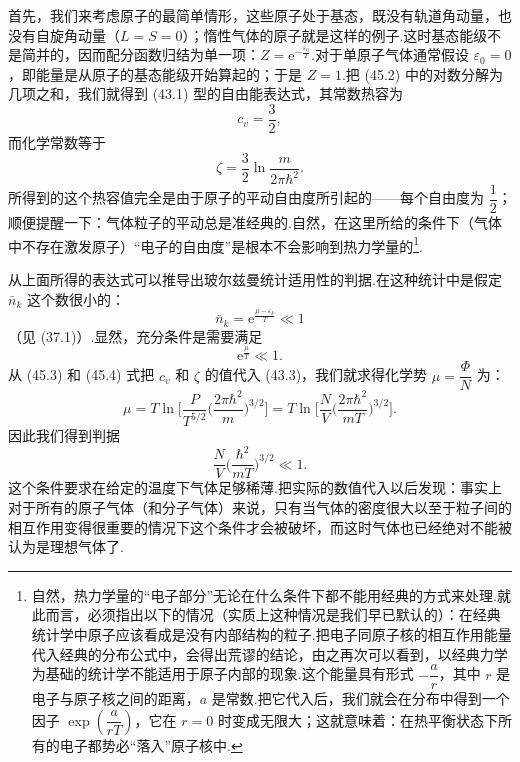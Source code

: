 首先，我们来考虑原子的最简单情形，这些原子处于基态，既没有轨道角动量，也没有自旋角动量（$L=S=0$）；惰性气体的原子就是这样的例子.这时基态能级不是简并的，因而配分函数归结为单一项：$Z=\mathrm{e}^{-\frac{\varepsilon_0}{T}}$.对于单原子气体通常假设 $\varepsilon_0=0$，即能量是从原子的基态能级开始算起的；于是 $Z=1$.把 (45.2) 中的对数分解为几项之和，我们就得到 (43.1) 型的自由能表达式，其常数热容为
\begin{equation}
  c_v=\frac{3}{2},
\end{equation}
而化学常数等于
\begin{equation}
  \zeta=\frac{3}{2}\ln\frac{m}{2\pi\hbar^2}.
\end{equation}
所得到的这个热容值完全是由于原子的平动自由度所引起的——每个自由度为 $\dfrac{1}{2}$；顺便提醒一下：气体粒子的平动总是准经典的.自然，在这里所给的条件下（气体中不存在激发原子）“电子的自由度”是根本不会影响到热力学量的\footnote{自然，热力学量的“电子部分”无论在什么条件下都不能用经典的方式来处理.就此而言，必须指出以下的情况（实质上这种情况是我们早已默认的）：在经典统计学中原子应该看成是没有内部结构的粒子.把电子同原子核的相互作用能量代入经典的分布公式中，会得出荒谬的结论，由之再次可以看到，以经典力学为基础的统计学不能适用于原子内部的现象.这个能量具有形式 $-\dfrac{a}{r}$，其中 $r$ 是电子与原子核之间的距离，$a$ 是常数.把它代入后，我们就会在分布中得到一个因子 $\exp\left(\dfrac{a}{rT}\right)$，它在 $r=0$ 时变成无限大；这就意味着：在热平衡状态下所有的电子都势必“落入”原子核中.}.

从上面所得的表达式可以推导出玻尔兹曼统计适用性的判据.在这种统计中是假定 $\bar{n}_k$ 这个数很小的：
\begin{equation*}
  \bar{n}_k=\mathrm{e}^{\frac{\mu-\varepsilon_k}{T}}\ll1
\end{equation*}
（见 (37.1)）.显然，充分条件是需要满足
\begin{equation*}
  \mathrm{e}^{\frac{\mu}{T}}\ll1.
\end{equation*}
从 (45.3) 和 (45.4) 式把 $c_v$ 和 $\zeta$ 的值代入 (43.3)，我们就求得化学势 $\mu=\dfrac{\Phi}{N}$ 为：
\begin{equation}
  \mu=T\ln\Big[\frac{P}{T^{5/2}}\Big(\frac{2\pi\hbar^2}{m}\Big)^{3/2}\Big]
  =T\ln\Big[\frac{N}{V}\Big(\frac{2\pi\hbar^2}{mT}\Big)^{3/2}\Big].
\end{equation}
因此我们得到判据
\begin{equation}
  \frac{N}{V}\Big(\frac{\hbar^2}{mT}\Big)^{3/2}\ll1.
\end{equation}
这个条件要求在给定的温度下气体足够稀薄.把实际的数值代入以后发现：事实上对于所有的原子气体（和分子气体）来说，只有当气体的密度很大以至于粒子间的相互作用变得很重要的情况下这个条件才会被破坏，而这时气体也已经绝对不能被认为是理想气体了.


